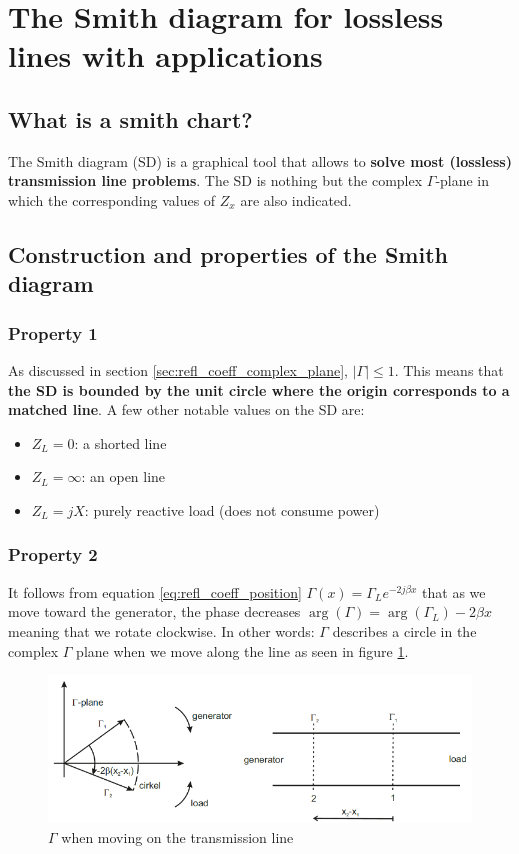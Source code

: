 \documentclass[../transmission.tex]{subfiles}
\begin{document}
	\section{The Smith diagram for lossless lines with applications}
		\subsection{What is a smith chart?}
			The Smith diagram (SD) is a graphical tool that allows to \textbf{solve most (lossless) transmission line problems}. The SD is nothing but the complex $\Gamma$-plane in which the corresponding values of $Z_x$ are also indicated. 
			
		\subsection{Construction and properties of the Smith diagram}
			\subsubsection{Property 1}
				As discussed in section \ref{sec:refl_coeff_complex_plane}, $|\Gamma|\leq1$. This means that \textbf{the SD is bounded by the unit circle where the origin corresponds to a matched line}. A few other notable values on the SD are:
				\begin{itemize}
					\item $Z_L=0$: a shorted line
					\item $Z_L=\infty$: an open line
					\item $Z_L=jX$: purely reactive load (does not consume power)
				\end{itemize}
			
			\subsubsection{Property 2}
				It follows from equation \ref{eq:refl_coeff_position} $\Gamma(x)=\Gamma_Le^{-2j\beta x}$ that as we move toward the generator, the phase decreases $\arg(\Gamma)=\arg(\Gamma_L)-2\beta x$ meaning that we rotate clockwise. In other words: $\Gamma$ describes a circle in the complex $\Gamma$ plane when we move along the line as seen in figure \ref{fig:chap03_prop2}. 
				\begin{figure}[h]
					\centering
					\includegraphics[width=0.8\linewidth]{../assets/chap03_prop2.png} %
					\caption{$\Gamma$ when moving on the transmission line}
					\label{fig:chap03_prop2}
				\end{figure}
				
\end{document}
